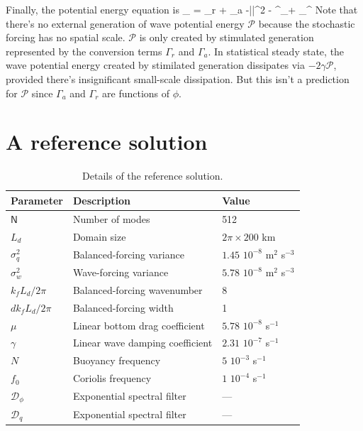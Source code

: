 \documentclass[12pt]{article}
\newcommand{\D}{\mathcal{D}}
\newcommand{\phis}{\phi^\star}
\renewcommand{\P}{\mathcal{P}}
\begin{document}
Finally, the potential energy equation  is
\beq
{} _{ \P} = \Gamma_r + \Gamma_a
 -\gamma \la |\nabla\phi|^2 \ra -  \la \lap\phis\D_\phi + \lap\phi\D_\phis \ra\per
\label{P}
\eeq
Note that there's no external generation of wave potential energy $\P$ because the
stochastic forcing has no spatial scale. $\P$ is only created by stimulated generation represented
by the conversion terms $\Gamma_r$ and $\Gamma_a$. In statistical steady state, the
wave potential energy created by stimilated generation dissipates via $-2\gamma\P$,
 provided there's insignificant small-scale dissipation. But this isn't a prediction
 for $\P$ since $\Gamma_a$ and $\Gamma_r$ are functions of $\phi$.

\section{A reference solution}

\begin{table}
 \begin{center}
   \caption{Details of the reference solution.}
   \label{parameters_reference}
   \begin{tabular}{ l | l | l }
     \hline
      Parameter & Description & Value \\
      \hline
      $\mathsf{N}$   & Number of modes &  512  \\
      $L_d$ & Domain size & $2\pi\times 200$ km \\
      $\sigma_q^2$ & Balanced-forcing variance & $1.45\,\,10^{-8}$ m$^2$ s$^{-3}$ \\
      $\sigma_w^2$ & Wave-forcing variance & $5.78\,\,10^{-8}$ m$^2$ s$^{-3}$ \\
      $k_f L_d/2\pi$    & Balanced-forcing wavenumber & 8 \\
      ${dk}_f L_d/2\pi$    & Balanced-forcing width &  1 \\
      $\mu$ & Linear bottom drag coefficient & $5.78\,\,10^{-8}$ s$^{-1}$ \\
      $\gamma$ & Linear wave damping coefficient & $2.31\,\,10^{-7}$ s$^{-1}$ \\
      $N$ & Buoyancy frequency &  $5\,\,10^{-3}$ s$^{-1}$\\
      $f_0$ & Coriolis frequency &  $1\,\,10^{-4}$ s$^{-1}$\\
      $\D_\phi$ & Exponential spectral filter & ---\\
      $\D_q$ & Exponential spectral filter & ---\\
   \end{tabular}
 \end{center}
\end{table}
\end{document}
